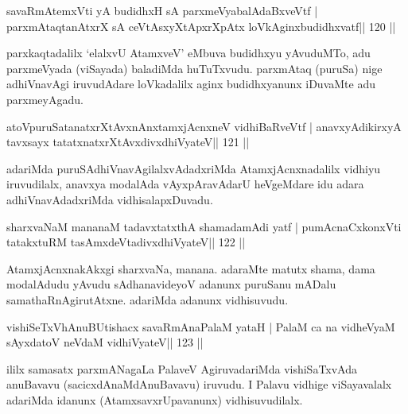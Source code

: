 \begin{shl}
savaRmAtemxVti yA budidhxH sA parxmeVyabalAdaBxveVtf |
parxmAtaqtanAtxrX sA ceVtAsxyXtApxrXpAtx loVkAginxbudidhxvatf\hfill || 120 ||
\end{shl}

\begin{artha}
parxkaqtadalilx `elalxvU AtamxveV' eMbuva budidhxyu yAvuduMTo, adu parxmeVyada (viSayada) baladiMda huTuTxvudu. parxmAtaq (puruSa) nige adhiVnavAgi iruvudAdare loVkadalilx aginx budidhxyanunx iDuvaMte adu parxmeyAgadu.
\end{artha}

\begin{shl}
atoV\s puruSatanatxrXtAvxnAnx\s\s tamxjAcnxneV vidhiBaRveVtf |
anavxyAdikirxyA tavxsayx tatatxnatxrXtAvxdivxdhiVyateV\hfill || 121 ||
\end{shl}

\begin{artha}
adariMda puruSAdhiVnavAgilalxvAdadxriMda AtamxjAcnxnadalilx vidhiyu iruvudilalx, anavxya modalAda vAyxpAravAdarU heVgeMdare idu adara adhiVnavAdadxriMda vidhisalapxDuvadu.
\end{artha}


\begin{shl}
sharxvaNaM mananaM tadavxtatxthA shamadamAdi yatf |
pumAcnaCxkonxVti tatakxtuRM tasAmxdeVtadivxdhiVyateV\hfill || 122 ||
\end{shl}

\begin{artha}
AtamxjAcnxnakAkxgi sharxvaNa, manana. adaraMte matutx shama, dama modalAdudu yAvudu sAdhanavideyoV adanunx puruSanu mADalu samathaRnAgirutAtxne. adariMda adanunx vidhisuvudu.
\end{artha}


\begin{shl}
vishiSeTxVhAnuBUtishacx savaRmAnaPalaM yataH |
PalaM ca na vidheVyaM sAyxdatoV neVdaM vidhiVyateV\hfill || 123 ||
\end{shl}

\begin{artha}
ililx samasatx parxmANagaLa PalaveV AgiruvadariMda vishiSaTxvAda anuBavavu (sacicxdAnaMdAnuBavavu) iruvudu. I Palavu vidhige viSayavalalx adariMda idanunx (AtamxsavxrUpavanunx) vidhisuvudilalx.
\end{artha}


